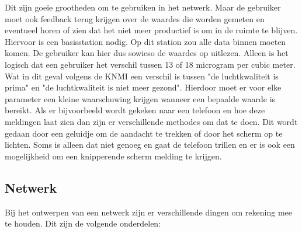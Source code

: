 Dit zijn goeie grootheden om te gebruiken in het netwerk. Maar de gebruiker moet ook feedback terug krijgen over de waardes die worden
gemeten en eventueel horen of zien dat het niet meer productief is om in de ruimte te blijven. Hiervoor is een basisstation nodig. 
Op dit station zou alle data binnen moeten komen. De gebruiker kan hier dus sowieso de waardes op uitlezen. Alleen is het logisch dat
een gebruiker het verschil tussen 13 of 18 microgram per cubic meter. Wat in dit geval volgens de KNMI \cite{Gezonde} een verschil is tussen
"de luchtkwaliteit is prima" en "de luchtkwaliteit is niet meer gezond". Hierdoor moet er voor elke parameter een kleine waarschuwing krijgen
wanneer een bepaalde waarde is bereikt. Als er bijvoorbeeld wordt gekeken naar een telefoon en hoe deze meldingen laat zien dan zijn er 
verschillende methodes om dat te doen. Dit wordt gedaan door een geluidje om de aandacht te trekken of door het scherm op te lichten. Soms
is alleen dat niet genoeg en gaat de telefoon trillen en er is ook een mogelijkheid om een knipperende scherm melding te krijgen.


\subsection{Netwerk}

Bij het ontwerpen van een netwerk zijn er verschillende dingen om rekening mee te houden. Dit zijn de volgende onderdelen: 

